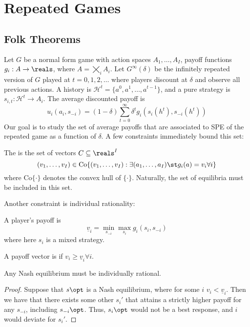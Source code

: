 \documentclass[10pt]{article}
\begin{document}
\section{Repeated Games}

\subsection{Folk Theorems}

Let $G$ be a normal form game with action spaces $A_1,\dots,A_I$, payoff functions $g_i: A \to \reals$, where $A = \bigtimes_i A_i$. Let $G^\infty(\delta)$ be the infinitely repeated version of $G$ played at $t= 0,1,2,\dots$ where players discount at $\delta$ and observe all previous actions. A history is $\mathcal{H}^t = \{a^0,a^1,\dots,a^{t-1}\}$, and a pure strategy is $s_{i,t} : \mathcal{H}^t \to A_i$. The average discounted payoff is \[u_i(a_i,s_{-i}) = (1-\delta) \sum_{t=0}^\infty \delta^t g_i(s_i(h^t),s_{-i}(h^t))\]Our goal is to study the set of average payoffs that are associated to SPE of the repeated game as a function of $\delta$. A few constraints immediately bound this set:

\begin{definition}
	The  is the set of vectors $C \subseteq \reals^I$ \[(v_1,\dots,v_I) \in \text{Co}\{ (v_1,\dots,v_I) : \exists (a_1,\dots,a_I) \st g_i(a) = v_i \forall i\}\]where Co$\{\cdot\}$ denotes the convex hull of $\{\cdot\}$. Naturally, the set of equilibria must be included in this set.
\end{definition}

Another constraint is individual rationality:

\begin{definition}
	A player's  payoff is \[\underline{v}_i = \min_{s_{-i}}\max_{s_i} g_i(s_i,s_{-i})\]where here $s_i$ is a mixed strategy.
\end{definition}

\begin{definition}
	A payoff vector is  if $v_i \ge \underline{v}_i \forall i$.
\end{definition}

\begin{lemma}
	Any Nash equilibrium must be individually rational.
\end{lemma}
\begin{proof}
	Suppose that $s\opt$ is a Nash equilibrium, where for some $i$ $v_i < \underline{v}_i$. Then we have that there exists some other $s_i'$ that attains a strictly higher payoff for any $s_{-i}$, including $s_{-i}\opt$. Thus, $s_i\opt$ would not be a best response, and $i$ would deviate for $s_i'$.
\end{proof}
\end{document}
